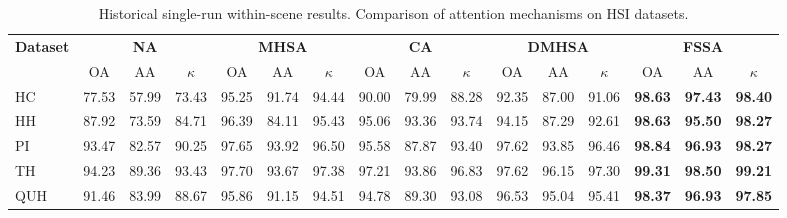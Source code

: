 \begin{table}[h]
\caption{Historical single-run within-scene results. Comparison of attention mechanisms on HSI datasets.}
\centering
\begin{adjustbox}{max width=\linewidth}
\begin{tabular}{|l|ccc|ccc|ccc|ccc|ccc|}
\hline
\multirow{2}{*}{\textbf{Dataset}}
& \multicolumn{3}{c|}{\textbf{NA}}
& \multicolumn{3}{c|}{\textbf{MHSA}}
& \multicolumn{3}{c|}{\textbf{CA}}
& \multicolumn{3}{c|}{\textbf{DMHSA}}
& \multicolumn{3}{c|}{\textbf{FSSA}} \\ \cline{2-16}

& OA & AA & $\kappa$
& OA & AA & $\kappa$
& OA & AA & $\kappa$
& OA & AA & $\kappa$
& OA & AA & $\kappa$ \\
\hline

HC
& 77.53 & 57.99 & 73.43
& 95.25 & 91.74 & 94.44
& 90.00 & 79.99 & 88.28
& 92.35 & 87.00 & 91.06
& \textbf{98.63} & \textbf{97.43} & \textbf{98.40} \\ \hline

HH
& 87.92 & 73.59 & 84.71
& 96.39 & 84.11 & 95.43
& 95.06 & 93.36 & 93.74
& 94.15 & 87.29 & 92.61
& \textbf{98.63} & \textbf{95.50} & \textbf{98.27} \\ \hline

PI
& 93.47 & 82.57 & 90.25
& 97.65 & 93.92 & 96.50
& 95.58 & 87.87 & 93.40
& 97.62 & 93.85 & 96.46
& \textbf{98.84} & \textbf{96.93} & \textbf{98.27} \\ \hline

TH
& 94.23 & 89.36 & 93.43
& 97.70 & 93.67 & 97.38
& 97.21 & 93.86 & 96.83
& 97.62 & 96.15 & 97.30
& \textbf{99.31} & \textbf{98.50} & \textbf{99.21} \\ \hline

QUH
& 91.46 & 83.99 & 88.67
& 95.86 & 91.15 & 94.51
& 94.78 & 89.30 & 93.08
& 96.53 & 95.04 & 95.41
& \textbf{98.37} & \textbf{96.93} & \textbf{97.85} \\ \hline

\end{tabular}
\end{adjustbox}

\label{tab:attention_comparison}
\end{table}














